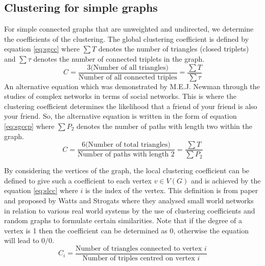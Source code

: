 \subsection{Clustering for simple graphs}
For simple connected graphs that are unweighted and undirected, we determine the coefficients of the clustering. The global clustering coefficient is defined by equation \ref{eq:sgcc} where $\sum{T}$ denotes the number of triangles (closed triplets) and $\sum{\tau}$ denotes the number of connected triplets in the graph.
\begin{equation} \label{eq:sgcc}
C = \frac{3\text{(Number of all triangles)}}{\text{Number of all connected triples}} = \frac{\sum{T}}{\sum{\tau}}
\end{equation}
An alternative equation which was demonstrated by M.E.J. Newman \cite{Newman_2003} through the studies of complex networks in terms of social networks. This is where the clustering coefficient determines the likelihood that a friend of your friend is also your friend. So, the alternative equation is written in the form of equation \ref{eq:sgccp} where $\sum{P_2}$ denotes the number of paths with length two within the graph.
\begin{equation} \label{eq:sgccp}
C = \frac{6\text{(Number of total triangles)}}{\text{Number of paths with length 2}} = \frac{\sum{T}}{\sum{P_2}}
\end{equation}

By considering the vertices of the graph, the local clustering coefficient can be defined to give such a coefficient to each vertex $v\in V(G)$ and is achieved by the equation \ref{eq:slcc} where $i$ is the index of the vertex. This definition is from paper \cite{Newman_2003} and proposed by Watts and Strogats \cite{Watts1998} where they analysed small world networks in relation to various real world systems by the use of clustering coefficients and random graphs to formulate certain similarities. Note that if the degree of a vertex is 1 then the coefficient can be determined as 0, otherwise the equation will lead to $0/0$.
\begin{equation} \label{eq:slcc}
C_i = \frac{\text{Number of triangles connected to vertex $i$}}{\text{Number of triples centred on vertex $i$}}
\end{equation}


